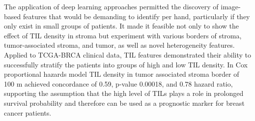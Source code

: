 The application of deep learning approaches permitted the discovery of image-based features that would be demanding to identify per hand, particularly if they only exist in small groups of patients. It made it feasible not only to show the effect of TIL density in stroma but experiment with various borders of stroma, tumor-associated stroma, and tumor, as well as novel heterogeneity features.
Applied to TCGA-BRCA clinical data, TIL features demonstrated their ability to successfully stratify the patients into groups of high and low TIL density. In Cox proportional hazards model TIL density in tumor associated stroma border of 100 \textmu m achieved concordance of 0.59, p-value 0.00018, and 0.78 hazard ratio, supporting the assumption that the high level of TILs plays a role in prolonged survival probability and therefore can be used as a prognostic marker for breast cancer patients.


\makeatletter
{}
{\renewcommand{\abstractname}{Kurzfassung}}
{\renewcommand{\abstractname}{Abstract}}
\makeatother

\chapter{\abstractname}

